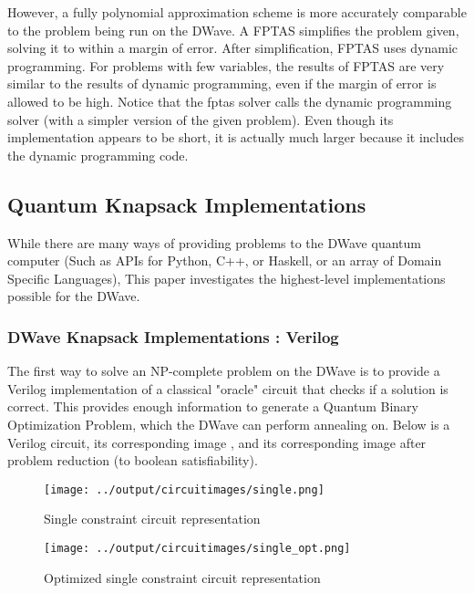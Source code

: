 \documentclass{article}
\begin{document}
However, a fully polynomial approximation scheme is more accurately comparable to the problem being run on the DWave.
A FPTAS simplifies the problem given, solving it to within a margin of error.
After simplification, FPTAS uses dynamic programming.
For problems with few variables, the results of FPTAS are very similar to the results of dynamic programming, even if the margin of error is allowed to be high.
Notice that the fptas solver calls the dynamic programming solver (with a simpler version of the given problem). Even though its implementation appears to be short, it is actually much larger because it includes the dynamic programming code.

\lstset{language=Python}

\newpage

\subsection{Quantum Knapsack Implementations}

While there are many ways of providing problems to the DWave quantum computer (Such as APIs for Python, C++, or Haskell, or an array of Domain Specific Languages), This paper investigates the highest-level implementations possible for the DWave.

\subsubsection{DWave Knapsack Implementations : Verilog}

The first way to solve an NP-complete problem on the DWave is to provide a Verilog implementation of a classical "oracle" circuit that checks if a solution is correct.
This provides enough information to generate a Quantum Binary Optimization Problem, which the DWave can perform annealing on.
Below is a Verilog circuit, its corresponding image , and its corresponding image after problem reduction (to boolean satisfiability).

\lstset{language=Verilog}


\newpage
\begin{figure}[h!]
  \texttt{[image: ../output/circuitimages/single.png]}
  \caption{Single constraint circuit representation}
  \label{fig:single}
\end{figure}
\begin{figure}[h!]
  \texttt{[image: ../output/circuitimages/single\_opt.png]}
  \caption{Optimized single constraint circuit representation}
  \label{fig:opt_single}
\end{figure}
\newpage
\end{document}
